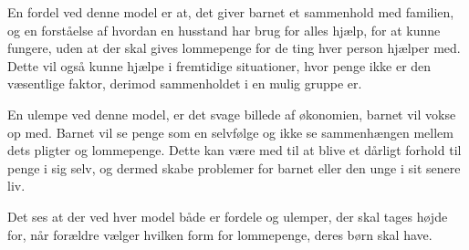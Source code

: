 En fordel ved denne model er at, det giver 
barnet et sammenhold med familien, og en 
forståelse af hvordan en husstand har brug for 
alles hjælp, for at kunne fungere, uden at der 
skal gives lommepenge for de ting hver person 
hjælper med. Dette vil også kunne hjælpe 
i fremtidige situationer, hvor penge 
ikke er den væsentlige faktor, derimod sammenholdet i en mulig 
gruppe er.

En ulempe ved denne model, er det svage 
billede af økonomien, barnet vil vokse op med. 
Barnet vil se penge som en selvfølge og ikke se 
sammenhængen mellem dets pligter og 
lommepenge. Dette kan være med til at blive et 
dårligt forhold til penge i sig selv, og dermed 
skabe problemer for barnet eller den unge i sit 
senere liv.

Det ses at der ved hver model både er fordele og ulemper, der skal tages højde for, når 
forældre vælger hvilken form for lommepenge, 
deres børn skal have.


